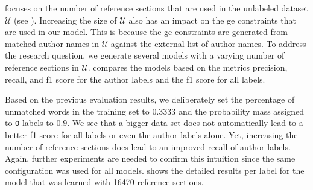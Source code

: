 \bigskip

 focuses on the number of reference sections that are used in the unlabeled dataset $\mathcal{U}$ (see ).
Increasing the size of $\mathcal{U}$ also has an impact on the \gls{ge} constraints that are used in our model.
This is because the \gls{ge} constraints are generated from matched author names in $\mathcal{U}$ against the external list of author names.
To address the research question, we generate several models with a varying number of reference sections in $\mathcal{U}$.
 compares the models based on the metrics \gls{precision}, \gls{recall}, and \gls{f1 score} for the author labels and the \gls{f1 score} for all labels.
\begin{table}
\hspace{-0.25\textwidth}
\caption{Comparison of models that use different numbers of reference sections for the model learning. The best score in each row is highlighted.}
\label{tab:eval-training-size}
\end{table}
Based on the previous evaluation results, we deliberately set the percentage of unmatched words in the training set to $0.3333$ and the probability mass assigned to \texttt{O} labels to $0.9$.
We see that a bigger data set does not automatically lead to a better \gls{f1 score} for all labels or even the author labels alone.
Yet, increasing the number of reference sections does lead to an improved \gls{recall} of author labels.
Again, further experiments are needed to confirm this intuition since the same configuration was used for all models.
 shows the detailed results per label for the model that was learned with \num{16470} reference sections.

